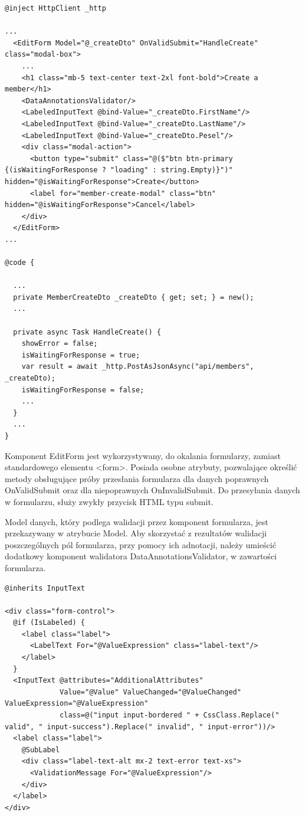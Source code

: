 \begin{lstlisting}[language=CSharp, caption={Przykład formularza danych w aplikacji klienckiej}, label=lst:editForm]
@inject HttpClient _http

...
  <EditForm Model="@_createDto" OnValidSubmit="HandleCreate" class="modal-box">
    ...
    <h1 class="mb-5 text-center text-2xl font-bold">Create a member</h1>
    <DataAnnotationsValidator/>
    <LabeledInputText @bind-Value="_createDto.FirstName"/>
    <LabeledInputText @bind-Value="_createDto.LastName"/>
    <LabeledInputText @bind-Value="_createDto.Pesel"/>
    <div class="modal-action">
      <button type="submit" class="@($"btn btn-primary {(isWaitingForResponse ? "loading" : string.Empty)}")" hidden="@isWaitingForResponse">Create</button>
      <label for="member-create-modal" class="btn" hidden="@isWaitingForResponse">Cancel</label>
    </div>
  </EditForm>
...

@code {
  
  ...
  private MemberCreateDto _createDto { get; set; } = new();
  ...

  private async Task HandleCreate() {
    showError = false;
    isWaitingForResponse = true;
    var result = await _http.PostAsJsonAsync("api/members", _createDto);
    isWaitingForResponse = false;
    ...
  }
  ...
}
\end{lstlisting}

Komponent EditForm jest wykorzystywany, do okalania formularzy, zamiast standardowego elementu <form>. Posiada osobne atrybuty, pozwalające określić metody obsługujące próby przesłania formularza dla danych poprawnych OnValidSubmit oraz dla niepoprawnych OnInvalidSubmit. Do przesyłania danych w formularzu, służy zwykły przycisk HTML typu submit.

Model danych, który podlega walidacji przez komponent formularza, jest przekazywany w atrybucie Model. Aby skorzystać z rezultatów walidacji poszczególnych pól formularza, przy pomocy ich adnotacji, należy umieścić dodatkowy komponent walidatora DataAnnotationsValidator, w zawartości formularza. 

\begin{lstlisting}[language=CSharp, caption={Rozszerzony komponent pola tekstowego formularza w aplikacji klienckiej}, label=lst:inputText]
@inherits InputText

<div class="form-control">
  @if (IsLabeled) {
    <label class="label">
      <LabelText For="@ValueExpression" class="label-text"/>
    </label>
  }
  <InputText @attributes="AdditionalAttributes"
             Value="@Value" ValueChanged="@ValueChanged" ValueExpression="@ValueExpression"
             class=@("input input-bordered " + CssClass.Replace(" valid", " input-success").Replace(" invalid", " input-error"))/>
  <label class="label">
    @SubLabel
    <div class="label-text-alt mx-2 text-error text-xs">
      <ValidationMessage For="@ValueExpression"/>
    </div>
  </label>
</div>
\end{lstlisting}

